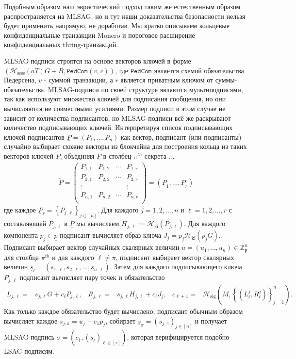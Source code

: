 \documentclass{mrl}
\theoremstyle{definition}
\numberwithin{theorem}{subsection}
\newcommand{\scalarField}{\mathbb{Z}_{\mathfrak{p}}}
\begin{document}
Подобным образом наш эвристический подход таким же естественным образом распространяется на MLSAG, но и тут наши доказательства безопасности нельзя будет применить напрямую, не доработав. Мы кратко описываем кольцевые конфиденциальные транзакции Monero и пороговое расширение конфиденциальных thring-транзакций.

MLSAG-подписи строятся на основе векторов ключей в форме $(\mathcal{H}_{\text{sess}}(a T) G + B, \texttt{PedCom}(v, r))$, где $\texttt{PedCom}$ является схемой обязательства Педерсена, $v$ - суммой транзакции, а $r$ является приватным ключом от суммы-обязательства. MLSAG-подписи по своей структуре являются мультиподписями, так как используют множество ключей для подписания сообщения, но они вычисляются не совместными усилиями. Размер подписи в этом случае не зависит от количества подписантов, но MLSAG-подписи всё же раскрывают количество подписывающих ключей. Интерпретируя список подписывающих ключей подписантов $\underline{P} = (P_1,\ldots,P_n)$ как вектор, подписант (или подписанты) случайно выбирает схожие векторы из блокчейна для построения кольца из таких векторов ключей $\widetilde{\underline{P}}$, объединяя $\underline{P}$ в столбец $\pi^{th}$ секрета $\pi$.
\begin{align*}
\widetilde{\underline{P}} =
\begin{pmatrix}
P_{1,1} & P_{1, 2} & \cdots & P_{1, r} \\
P_{2,1} & P_{2, 2} & \cdots & P_{2, r} \\
\vdots & & & \vdots \\
P_{n,1} & P_{n, 2} & \cdots & P_{n,r} \\
\end{pmatrix} = (\underline{P}_1, \ldots, \underline{P}_r)
\end{align*}
где каждое $\underline{P}_\ell = \left\{P_{j,\ell}\right\}_{j \in [n]}$. Для каждого $j = 1, 2, \ldots, n$ и $\ell = 1, 2, \ldots, r$ с составляющей $P_{j,\ell}$ в $\widetilde{\underline{P}}$ мы вычисляем $H_{j,\ell} := \mathcal{H}_{\text{ki}}(P_{j,\ell})$. Для каждого компонента $p_j \in \underline{p}$ подписант вычисляет образ ключа $J_j = p_j \mathcal{H}_{\text{ki}}(p_j G)$. Подписант выбирает вектор случайных скалярных величин $\underline{u} = (u_1, \ldots, u_n) \in \scalarField^n$ для столбца $\pi^{th}$ и для каждого $\ell \neq \pi$, подписант выбирает вектор скалярных величин $\underline{s}_\ell = (s_{1,\ell}, s_{2,\ell}, \ldots, s_{n,\ell})$. Затем для каждого подписывающего ключа $P_{j, \ell}$ подписант вычисляет пару точек и обязательство
\begin{align*}
L_{j, \ell} =& s_{j,\ell} G + c_\ell P_{j, \ell}, & R_{j,\ell} =& s_{j,\ell} H_{j, \ell} + c_\ell J_j, &
c_{\ell+1} =& \mathcal{H}_{\text{sig}}\left(M,\left\{(L_{\ell}^{j}, R_{\ell}^{j} )\right\}_{j=1}^{n}\right).
\end{align*}
Как только каждое обязательство будет вычислено, подписант обычным образом вычисляет каждое $s_{j,\pi} = u_j - c_\pi p_j$, собирает $\underline{s}_\pi = (s_{j, \pi})_{j \in [n]}$ и получает MLSAG-подпись $\sigma = (c_1, (\underline{s}_\ell)_{\ell \in [r]})$, которая верифицируется подобно LSAG-подписям.
\end{document}
